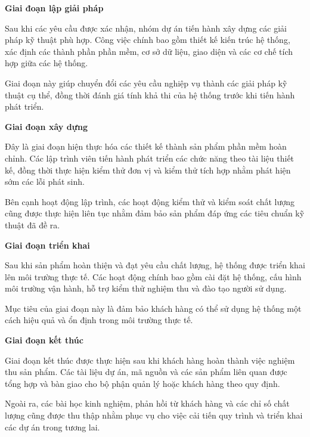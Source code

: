 \textbf{Giai đoạn lập giải pháp}

\hspace{0.2cm}Sau khi các yêu cầu được xác nhận, nhóm dự án tiến hành xây dựng các giải pháp kỹ thuật phù hợp. Công việc chính bao gồm thiết kế kiến trúc hệ thống, xác định các thành phần phần mềm, cơ sở dữ liệu, giao diện và các cơ chế tích hợp giữa các hệ thống.

\hspace{0.2cm}Giai đoạn này giúp chuyển đổi các yêu cầu nghiệp vụ thành các giải pháp kỹ thuật cụ thể, đồng thời đánh giá tính khả thi của hệ thống trước khi tiến hành phát triển.

\textbf{Giai đoạn xây dựng}

\hspace{0.2cm}Đây là giai đoạn hiện thực hóa các thiết kế thành sản phẩm phần mềm hoàn chỉnh. Các lập trình viên tiến hành phát triển các chức năng theo tài liệu thiết kế, đồng thời thực hiện kiểm thử đơn vị và kiểm thử tích hợp nhằm phát hiện sớm các lỗi phát sinh.

\hspace{0.2cm}Bên cạnh hoạt động lập trình, các hoạt động kiểm thử và kiểm soát chất lượng cũng được thực hiện liên tục nhằm đảm bảo sản phẩm đáp ứng các tiêu chuẩn kỹ thuật đã đề ra.

\textbf{Giai đoạn triển khai}

\hspace{0.2cm}Sau khi sản phẩm hoàn thiện và đạt yêu cầu chất lượng, hệ thống được triển khai lên môi trường thực tế. Các hoạt động chính bao gồm cài đặt hệ thống, cấu hình môi trường vận hành, hỗ trợ kiểm thử nghiệm thu và đào tạo người sử dụng.

\hspace{0.2cm}Mục tiêu của giai đoạn này là đảm bảo khách hàng có thể sử dụng hệ thống một cách hiệu quả và ổn định trong môi trường thực tế.


\textbf{Giai đoạn kết thúc}

\hspace{0.2cm}Giai đoạn kết thúc được thực hiện sau khi khách hàng hoàn thành việc nghiệm thu sản phẩm. Các tài liệu dự án, mã nguồn và các sản phẩm liên quan được tổng hợp và bàn giao cho bộ phận quản lý hoặc khách hàng theo quy định.

\hspace{0.2cm}Ngoài ra, các bài học kinh nghiệm, phản hồi từ khách hàng và các chỉ số chất lượng cũng được thu thập nhằm phục vụ cho việc cải tiến quy trình và triển khai các dự án trong tương lai.

